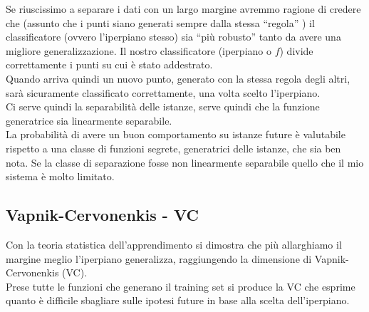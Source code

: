 Se riuscissimo a separare i dati con un largo margine avremmo ragione di credere che (assunto che i punti siano generati sempre dalla stessa “regola” ) il classificatore (ovvero l'iperpiano stesso) sia “più robusto” tanto da avere una migliore generalizzazione. Il nostro classificatore (iperpiano o $f$) divide correttamente i punti su cui è stato addestrato. \\
Quando arriva quindi un nuovo punto, generato con la stessa regola degli altri, sarà sicuramente classificato correttamente, una volta scelto l'iperpiano.\\ 
Ci serve quindi la separabilità delle istanze, serve quindi che la funzione generatrice sia linearmente separabile. \\
La probabilità di avere un buon comportamento su istanze future è valutabile rispetto a una classe di funzioni segrete, generatrici delle istanze, che sia ben nota. Se la classe di separazione fosse non linearmente separabile quello che il mio sistema è molto limitato. 
\subsection{Vapnik-Cervonenkis - VC}
Con la teoria statistica dell'apprendimento si dimostra che più allarghiamo il margine meglio l’iperpiano generalizza, raggiungendo la dimensione di Vapnik-Cervonenkis (VC).\\ Prese tutte le funzioni che generano il training set si produce la VC che esprime quanto è difficile sbagliare sulle ipotesi future in base alla scelta dell'iperpiano.\\

